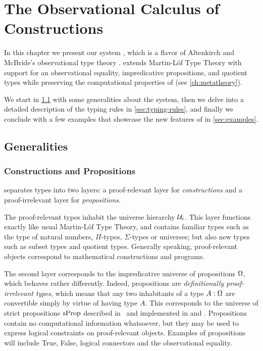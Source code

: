 \setchapterpreamble[u]{\margintoc}
\chapter{The Observational Calculus of Constructions}
\label{sec:type-theory-with}

In this chapter we present our system \SetoidCC, which is a flavor of 
Altenkirch and McBride's observational type theory \cite{altenkirchAl:plpv2007}.
% 
\SetoidCC extends Martin-Löf Type Theory with support for an observational 
equality, impredicative propositions, and quotient types while preserving the
computational properties of \MLTT (see \cref{ch:metatheory}).

We start in \cref{sec:generalities} with some generalities about the system, then we delve 
into a detailed description of the typing rules in \cref{sec:typing-rules}, and 
finally we conclude with a few examples that showcase the new features of 
\SetoidCC in \cref{sec:examples}.

\section{Generalities}
\label{sec:generalities}

\subsection{Constructions and Propositions}

\SetoidCC separates types into two layers: a proof-relevant layer for 
\emph{constructions} and a proof-irrelevant layer for \emph{propositions}. 

The proof-relevant types inhabit the universe hierarchy \( \mathcal{U}_i \).
% 
This layer functions exactly like usual Martin-Löf Type Theory, and
contains familiar types
such as the type of natural numbers, \( \Pi \)-types, \( \Sigma \)-types or 
universes; but also new types such as subset types and quotient types.
% 
Generally speaking, proof-relevant objects correspond to mathematical 
constructions and programs.

The second layer corresponds to the impredicative universe of propositions 
\( \Omega \), which behaves rather differently.
% 
Indeed, propositions are \emph{definitionally proof-irrelevant types}, which 
means that any two inhabitants of a type \( A : \Omega \) are convertible
simply by virtue of having type \( A \). 
% 
This corresponds to the universe of strict propositions
\( \mathrm{sProp} \) described in~ and implemented 
in \Coq and \Lean.
% 
Propositions contain no computational information whatsoever, but they may be 
used to express logical constraints on proof-relevant objects.
% 
Examples of propositions will include True, False, logical connectors and the 
observational equality.

